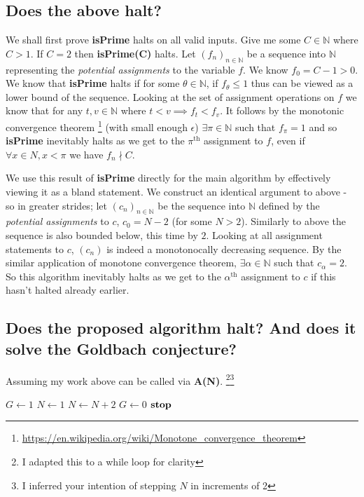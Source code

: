 \documentclass{article}
\begin{document}
\subsection{Does the above halt?}
We shall first prove \textbf{isPrime} halts on all valid inputs. Give me some $C \in \mathbb{N}$ where $C>1$. If $C=2$ then \textbf{isPrime(C)} halts. Let $(f_n)_{n\in\mathbb{N}}$ be a sequence into $\mathbb{N}$ representing the \emph{potential assignments} to the variable $f$. We know $f_0 = C - 1 > 0$. We know that \textbf{isPrime} halts if for some $\theta \in \mathbb{N}$, if $f_{\theta} \leq 1$ thus can be viewed as a lower bound of the sequence. Looking at the set of assignment operations on $f$ we know that for any $t,v \in \mathbb{N}$ where $t < v \implies f_t < f_v$. It follows by the monotonic convergence theorem \footnote{\url{https://en.wikipedia.org/wiki/Monotone_convergence_theorem}} (with small enough $\epsilon$) $\exists \pi \in \mathbb{N}$ such that $f_{\pi} = 1$ and so \textbf{isPrime} inevitably halts as we get to the $\pi^{\text{th}}$ assignment to $f$, even if $\forall x \in N, x< \pi$ we have $f_n \nmid C$.

We use this result of \textbf{isPrime} directly for the main algorithm by effectively viewing it as a bland statement. We construct an identical argument to above - so in greater strides; let $(c_n)_{n\in\mathbb{N}}$ be the sequence into $\mathbb{N}$ defined by the \emph{potential assignments} to $c$, $c_0 = N - 2$ (for some $N > 2$). Similarly to above the sequence is also bounded below, this time by $2$. Looking at all assignment statements to $c$, $(c_n)$ is indeed a monotonocally decreasing sequence. By the similar application of monotone convergence theorem, $\exists \alpha \in \mathbb{N}$ such that $c_{\alpha} = 2$. So this algorithm inevitably halts as we get to the $\alpha^{\text{th}}$ assignment to $c$ if this hasn't halted already earlier.

\pagebreak
\subsection{Does the proposed algorithm halt? And does it solve the Goldbach conjecture?}
Assuming my work above can be called via \textbf{A(N)}.
\footnote{I adapted this to a while loop for clarity}\footnote{I inferred your intention of stepping $N$ in increments of 2}

\begin{algorithmic}[1]
	\STATE $G \leftarrow 1$
	\STATE $N \leftarrow 1$
			\STATE $N \leftarrow N + 2$
		\ENDWHILE
		\STATE $G \leftarrow 0$
	\STATE $\text{\textbf{stop}}$ 
\end{algorithmic}
\end{document}
